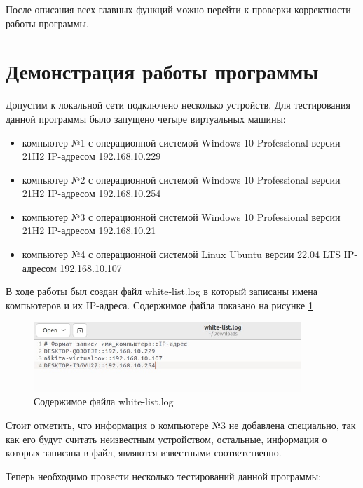 \documentclass[bachelor, och, coursework]{SCWorks}
\begin{document}
    После описания всех главных функций можно перейти к проверки корректности работы программы.

  \section{Демонстрация работы программы}
  Допустим к локальной сети подключено несколько устройств. Для тестирования данной программы было запущено четыре виртуальных машины:

  \begin{itemize}
    \item компьютер №1 с операционной системой Windows 10 Professional версии 21H2 IP-адресом 192.168.10.229
    \item компьютер №2 с операционной системой Windows 10 Professional версии 21H2 IP-адресом 192.168.10.254
    \item компьютер №3 с операционной системой Windows 10 Professional версии 21H2 IP-адресом 192.168.10.21
    \item компьютер №4 с операционной системой Linux Ubuntu версии 22.04 LTS IP-адресом 192.168.10.107
  \end{itemize}

  В ходе работы был создан файл white-list.log в который записаны имена компьютеров и их IP-адреса. Содержимое файла показано на
  рисунке \ref{white-list}

  \begin{figure}[H]
    \centering
    \includegraphics[width=0.9\textwidth]{photo/white-list.png}
    \caption{Содержимое файла white-list.log}
    \label{white-list}
  \end{figure}
  
  Стоит отметить, что информация о компьютере №3 не добавлена специально, так как его будут считать неизвестным устройством, остальные,
  информация о которых записана в файл, являются известными соответственно.
  
  Теперь необходимо провести несколько тестирований данной программы:
\end{document}
